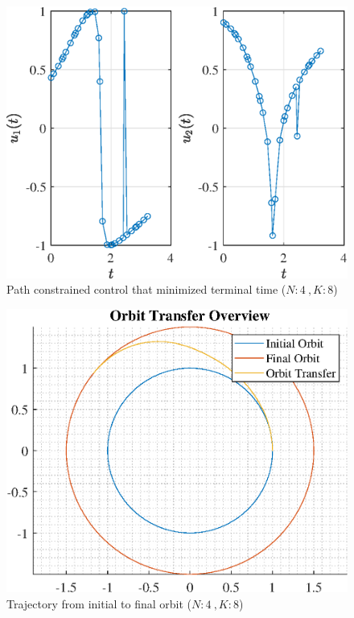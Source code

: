 \documentclass[]{article}
\begin{document}
\begin{figure}
	\centering
	\includegraphics[scale=0.75]{path_N4_K8_C3_tf.eps}
	\caption{Path constrained control that minimized terminal time (\(N:4\ , K:8\))}
	\label{fig:path_N4_K8_C3_tf}
\end{figure}
\begin{figure}
	\centering
	\includegraphics[scale=0.75]{orbit_N4_K8_C3_tf.eps}
	\caption{Trajectory from initial to final orbit (\(N:4\ , K:8\))}
	\label{fig:orbit_N4_K8_C3_tf}
\end{figure}
\end{document}
